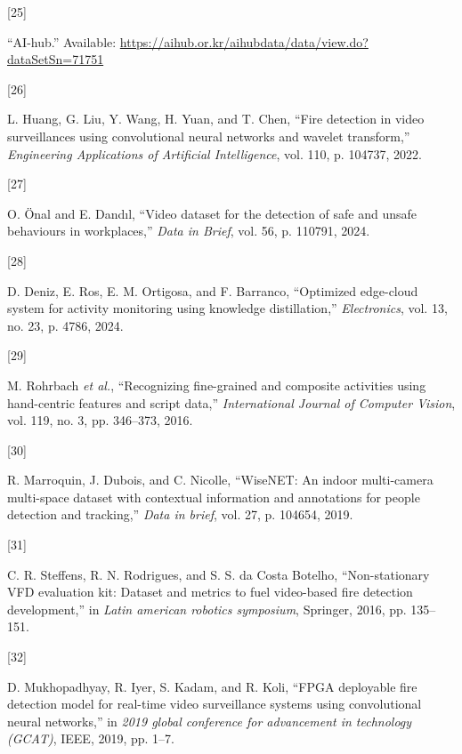 \documentclass[
  10pt,
]{article}
\newlength{\cslhangindent}
\newlength{\csllabelwidth}
\newenvironment{CSLReferences}[2] %
 {\begin{list}{}{%
  \setlength{\itemindent}{0pt}
  \setlength{\leftmargin}{0pt}
  \setlength{\parsep}{0pt}
  \ifodd #1
   \setlength{\leftmargin}{\cslhangindent}
   \setlength{\itemindent}{-1\cslhangindent}
  \fi
  \setlength{\itemsep}{#2\baselineskip}}}
 {\end{list}}
\newcommand{\CSLLeftMargin}[1]{\parbox[t]{\csllabelwidth}{\strut#1\strut}}
\newcommand{\CSLRightInline}[1]{\parbox[t]{\linewidth - \csllabelwidth}{\strut#1\strut}}
\begin{document}
\begin{CSLReferences}{0}{0}
\CSLLeftMargin{{[}25{]} }%
\CSLRightInline{{``AI-hub.''} Available:
\url{https://aihub.or.kr/aihubdata/data/view.do?dataSetSn=71751}}

\CSLLeftMargin{{[}26{]} }%
\CSLRightInline{L. Huang, G. Liu, Y. Wang, H. Yuan, and T. Chen, {``Fire
detection in video surveillances using convolutional neural networks and
wavelet transform,''} \emph{Engineering Applications of Artificial
Intelligence}, vol. 110, p. 104737, 2022.}

\CSLLeftMargin{{[}27{]} }%
\CSLRightInline{O. Önal and E. Dandıl, {``Video dataset for the
detection of safe and unsafe behaviours in workplaces,''} \emph{Data in
Brief}, vol. 56, p. 110791, 2024.}

\CSLLeftMargin{{[}28{]} }%
\CSLRightInline{D. Deniz, E. Ros, E. M. Ortigosa, and F. Barranco,
{``Optimized edge-cloud system for activity monitoring using knowledge
distillation,''} \emph{Electronics}, vol. 13, no. 23, p. 4786, 2024.}

\CSLLeftMargin{{[}29{]} }%
\CSLRightInline{M. Rohrbach \emph{et al.}, {``Recognizing fine-grained
and composite activities using hand-centric features and script data,''}
\emph{International Journal of Computer Vision}, vol. 119, no. 3, pp.
346--373, 2016.}

\CSLLeftMargin{{[}30{]} }%
\CSLRightInline{R. Marroquin, J. Dubois, and C. Nicolle, {``WiseNET: An
indoor multi-camera multi-space dataset with contextual information and
annotations for people detection and tracking,''} \emph{Data in brief},
vol. 27, p. 104654, 2019.}

\CSLLeftMargin{{[}31{]} }%
\CSLRightInline{C. R. Steffens, R. N. Rodrigues, and S. S. da Costa
Botelho, {``Non-stationary VFD evaluation kit: Dataset and metrics to
fuel video-based fire detection development,''} in \emph{Latin american
robotics symposium}, Springer, 2016, pp. 135--151.}

\CSLLeftMargin{{[}32{]} }%
\CSLRightInline{D. Mukhopadhyay, R. Iyer, S. Kadam, and R. Koli, {``FPGA
deployable fire detection model for real-time video surveillance systems
using convolutional neural networks,''} in \emph{2019 global conference
for advancement in technology (GCAT)}, IEEE, 2019, pp. 1--7.}


\end{CSLReferences}
\end{document}
